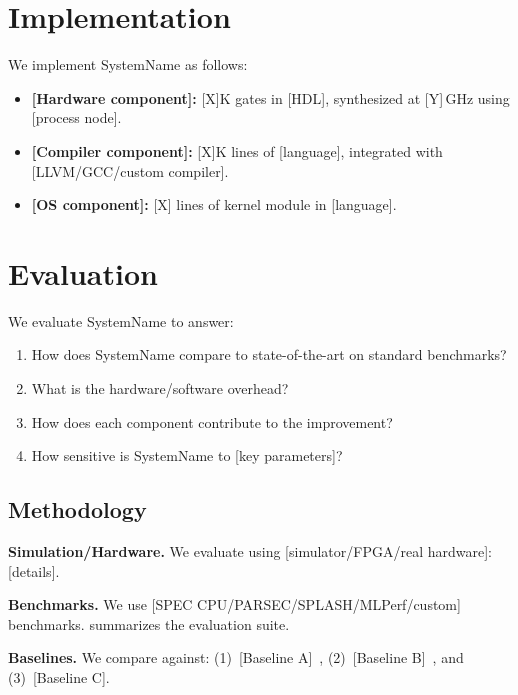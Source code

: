 \documentclass[sigplan,10pt]{acmart}
\newcommand{\system}{SystemName\xspace}
\newcommand{\para}[1]{\smallskip\noindent\textbf{#1.}}
\newcommand{\GHz}{\,GHz\xspace}
\begin{document}
\section{Implementation}
\label{sec:implementation}

We implement \system as follows:
\begin{itemize}
  \item \textbf{[Hardware component]:} [X]K gates in [HDL], synthesized
        at [Y]\GHz using [process node].
  \item \textbf{[Compiler component]:} [X]K lines of [language], integrated
        with [LLVM/GCC/custom compiler].
  \item \textbf{[OS component]:} [X] lines of kernel module in [language].
\end{itemize}

\section{Evaluation}
\label{sec:evaluation}

We evaluate \system to answer:
\begin{enumerate}
  \item How does \system compare to state-of-the-art on standard benchmarks?
  \item What is the hardware/software overhead?
  \item How does each component contribute to the improvement?
  \item How sensitive is \system to [key parameters]?
\end{enumerate}

\subsection{Methodology}
\label{sec:eval:method}

\para{Simulation/Hardware}
We evaluate using [simulator/FPGA/real hardware]: [details].

\para{Benchmarks}
We use [SPEC CPU/PARSEC/SPLASH/MLPerf/custom] benchmarks.
 summarizes the evaluation suite.

\para{Baselines}
We compare against:
(1)~[Baseline A]~\cite{jouppi2017tpu},
(2)~[Baseline B]~\cite{kwon2018maeri}, and
(3)~[Baseline C].
\end{document}
